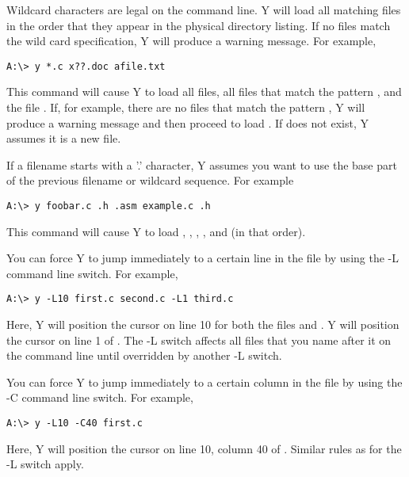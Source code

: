 Wildcard characters are legal on the command line. Y will load all matching files in the order
that they appear in the physical directory listing. If no files match the wild card
specification, Y will produce a warning message. For example,

\begin{verbatim}
A:\> y *.c x??.doc afile.txt
\end{verbatim}

This command will cause Y to load all  files, all files that match the pattern
, and the file . If, for example, there are no files that
match the pattern , Y will produce a warning message and then proceed to load
. If  does not exist, Y assumes it is a new file.

If a filename starts with a '.' character, Y assumes you want to use the base part of the
previous filename or wildcard sequence. For example

\begin{verbatim}
A:\> y foobar.c .h .asm example.c .h
\end{verbatim}

This command will cause Y to load , ,
, , and  (in that order).

You can force Y to jump immediately to a certain line in the file by using the -L command line
switch. For example,

\begin{verbatim}
A:\> y -L10 first.c second.c -L1 third.c
\end{verbatim}

Here, Y will position the cursor on line 10 for both the files  and
. Y will position the cursor on line 1 of . The -L switch
affects all files that you name after it on the command line until overridden by another -L
switch.

You can force Y to jump immediately to a certain column in the file by using the -C command line
switch. For example,

\begin{verbatim}
A:\> y -L10 -C40 first.c
\end{verbatim}

Here, Y will position the cursor on line 10, column 40 of . Similar rules as
for the -L switch apply.

